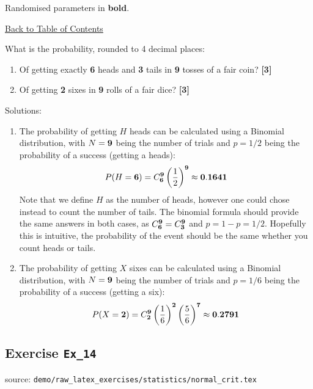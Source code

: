 \documentclass[a4paper, leqno, 12pt]{report}
\newenvironment{top_enumerate}{
\begin{enumerate}
  \setlength{\itemsep}{2em}
  \setlength{\topsep}{-0pt}
  \setlength{\partopsep}{-0pt}
}{\end{enumerate}}
\begin{document}
Randomised parameters in \textbf{bold}. 

\hyperlink{contents}{Back to Table of Contents}
\begin{top_enumerate}
\item What is the probability, rounded to 4 decimal places:
 
\setcounter{equation}{0}  %
\begin{enumerate}
	\setlength{\topsep}{-0pt}
	\setlength{\partopsep}{-0pt}
	\setlength{\itemsep}{10pt}
			\item Of getting exactly {\bf 6} heads and {\bf 3} tails in {\bf 9} tosses of a fair coin?
	 \quad \textbf{[3]}
		\item Of getting {\bf 2} sixes in {\bf 9} rolls of a fair dice?
	 \quad \textbf{[3]}
\end{enumerate}\addtocounter{enumi}{-1}
\item Solutions:
 
\setcounter{equation}{0}  %
\begin{enumerate}
	\setlength{\topsep}{-0pt}
	\setlength{\partopsep}{-0pt}
	\setlength{\itemsep}{10pt}
			\item The probability of getting $H$ heads can be calculated using a Binomial distribution, with $N={\bf 9}$ being the number of trials and $p=1/2$ being the probability of a success (getting a heads):
	\[
	P(H = {\bf 6})  = C^{{\bf 9}}_{{\bf 6}}  \left(\frac{1}{2}\right)^{{\bf 9}} \approx {\bf 0.1641}
	\]
	Note that we define $H$ as the number of heads, however one could chose instead to count the number of tails. The binomial formula should provide the same answers in both cases, as $C^{{\bf 9}}_{{\bf 6}} = C^{{\bf 9}}_{{\bf 3}}$ and $p=1-p=1/2$. Hopefully this is intuitive, the probability of the event should be the same whether you count heads or tails.
	 \quad \textbf{}
		\item The probability of getting $X$ sixes can be calculated using a Binomial distribution, with $N={\bf 9}$ being the number of trials and $p=1/6$ being the probability of a success (getting a six):
	\[
	P(X = {\bf 2})  = C^{{\bf 9}}_{{\bf 2}}  \left(\frac{1}{6}\right)^{{\bf 2}} \left(\frac{5}{6}\right)^{{\bf 7}} \approx {\bf 0.2791}
	\]
	 \quad \textbf{}
\end{enumerate}\newpage
\end{top_enumerate}
\subsection{Exercise \texttt{Ex\_14}}
source: \texttt{demo/raw\_latex\_exercises/statistics/normal\_crit.tex}
\end{document}
